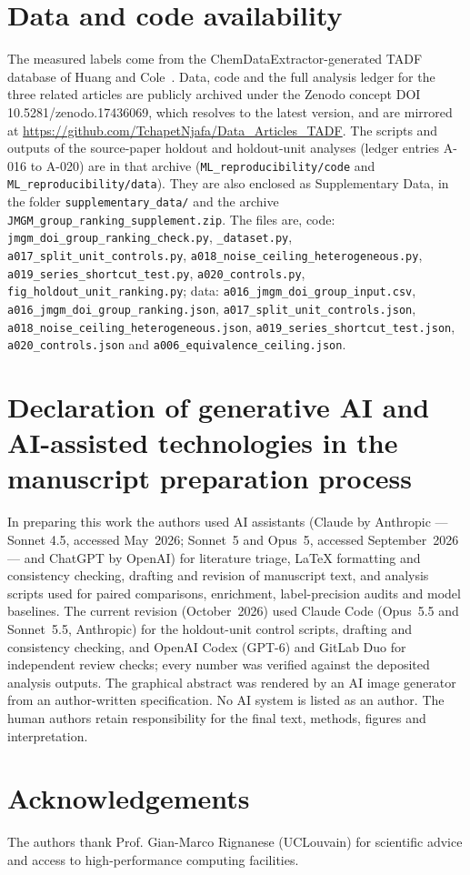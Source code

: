 \documentclass[final,3p,times,twocolumn]{elsarticle}
\begin{document}
\section*{Data and code availability}
The measured \deltaest labels come from the ChemDataExtractor-generated TADF
database of Huang and Cole~\cite{HuangCole2024}. Data, code and the full analysis ledger for the three related articles are publicly archived
under the Zenodo concept DOI 10.5281/zenodo.17436069, which resolves to the latest
version, and are mirrored at
\url{https://github.com/TchapetNjafa/Data_Articles_TADF}.
The scripts and outputs of the source-paper holdout and holdout-unit analyses
(ledger entries A-016 to A-020) are in that archive (\texttt{ML\_reproducibility/code}
and \texttt{ML\_reproducibility/data}). They are also enclosed as Supplementary Data,
in the folder \texttt{supplementary\_data/} and the archive
\texttt{JMGM\_group\_ranking\_supplement.zip}. The files are, code: \texttt{jmgm\_doi\_group\_ranking\_check.py}, \texttt{\_dataset.py}, \texttt{a017\_split\_unit\_controls.py}, \texttt{a018\_noise\_ceiling\_heterogeneous.py}, \texttt{a019\_series\_shortcut\_test.py}, \texttt{a020\_controls.py}, \texttt{fig\_holdout\_unit\_ranking.py}; data: \texttt{a016\_jmgm\_doi\_group\_input.csv}, \texttt{a016\_jmgm\_doi\_group\_ranking.json}, \texttt{a017\_split\_unit\_controls.json}, \texttt{a018\_noise\_ceiling\_heterogeneous.json}, \texttt{a019\_series\_shortcut\_test.json}, \texttt{a020\_controls.json} and \texttt{a006\_equivalence\_ceiling.json}.
\section*{Declaration of generative AI and AI-assisted technologies in the manuscript preparation process}
In preparing this work the authors used AI assistants (Claude by Anthropic --- Sonnet
4.5, accessed May~2026; Sonnet~5 and Opus~5, accessed September~2026 --- and ChatGPT by
OpenAI) for literature triage, \LaTeX{} formatting and consistency checking,
drafting and revision of manuscript text, and analysis scripts used for paired
comparisons, enrichment, label-precision audits and model baselines. The current
revision (October~2026) used Claude Code (Opus~5.5 and Sonnet~5.5, Anthropic)
for the holdout-unit control scripts, drafting and consistency checking, and
OpenAI Codex (GPT-6) and GitLab Duo for independent review checks; every
number was verified against the deposited analysis outputs. The graphical
abstract was rendered by an AI image generator from an author-written
specification. No AI system is listed
as an author. The human authors retain responsibility for the final text,
methods, figures and interpretation.
\section*{Acknowledgements}
The authors thank Prof. Gian-Marco Rignanese (UCLouvain) for scientific advice and
access to high-performance computing facilities.



\end{document}
